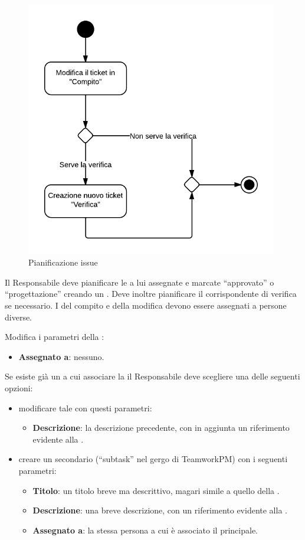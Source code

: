 \begin{figure}[H]
    \centering
    \includegraphics[width=11cm]{uml-processi/pianificazione_issue.png}
    \caption{Pianificazione issue}
\end{figure}

Il Responsabile deve pianificare le  a lui assegnate e marcate ``approvato'' o ``progettazione'' creando un . Deve inoltre pianificare il corrispondente  di verifica se necessario. I  del compito e della modifica devono essere assegnati a persone diverse.

Modifica i parametri della :
\begin{itemize}
 \item \textbf{Assegnato a}: nessuno.
\end{itemize}

Se esiste già un  a cui associare la  il Responsabile deve scegliere una delle seguenti opzioni:
\begin{itemize}
 \item modificare tale  con questi parametri:
	\begin{itemize}
		\item \textbf{Descrizione}: la descrizione precedente, con in aggiunta un riferimento evidente alla .
	\end{itemize}
 \item creare un  secondario (``subtask'' nel gergo di TeamworkPM) con i seguenti parametri:
	\begin{itemize}
		\item \textbf{Titolo}: un titolo breve ma descrittivo, magari simile a quello della .
		\item \textbf{Descrizione}: una breve descrizione, con un riferimento evidente alla .
		\item \textbf{Assegnato a}: la stessa persona a cui è associato il  principale.
	\end{itemize}
\end{itemize}

